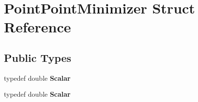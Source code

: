 \hypertarget{struct_point_point_minimizer}{}\section{Point\+Point\+Minimizer Struct Reference}
\label{struct_point_point_minimizer}
\subsection*{Public Types}
\begin{DoxyCompactItemize}
\item 
\mbox{\label{struct_point_point_minimizer_ad790dd824c05ec444ef18e03f2a08baa}} 
typedef double {\bfseries Scalar}
\item 
\mbox{\label{struct_point_point_minimizer_ad790dd824c05ec444ef18e03f2a08baa}} 
typedef double {\bfseries Scalar}
\end{DoxyCompactItemize}
